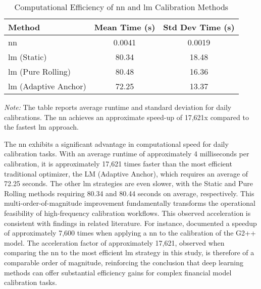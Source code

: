 \begin{table}[H]
	\centering
	\begin{threeparttable}
		\caption{Computational Efficiency of \ac{nn} and \ac{lm} Calibration Methods}
		\label{tab:comp_efficiency}
		\begin{tabular}{lcc}
			\toprule
			Method                       & Mean Time (s) & Std Dev Time (s) \\
			\midrule
			\ac{nn}                      & 0.0041        & 0.0019           \\
			\ac{lm} (Static)             & 80.34         & 18.48            \\
			\ac{lm} (Pure Rolling)       & 80.48         & 16.36            \\
			\ac{lm} (Adaptive Anchor) & 72.25         & 13.37            \\
			\bottomrule
		\end{tabular}
		\begin{tablenotes}
			\footnotesize
			\item \textit{Note:} The table reports average runtime and standard deviation for daily calibrations. The \ac{nn} achieves an approximate speed-up of 17,621x compared to the fastest \ac{lm} approach.
		\end{tablenotes}
	\end{threeparttable}
\end{table}

The \ac{nn} exhibits a significant advantage in computational speed for daily calibration tasks. With an average runtime of approximately 4 milliseconds per calibration, it is approximately 17,621 times faster than the most efficient traditional optimizer, the LM (Adaptive Anchor), which requires an average of 72.25 seconds. The other \ac{lm} strategies are even slower, with the Static and Pure Rolling methods requiring 80.34 and 80.44 seconds on average, respectively. This multi-order-of-magnitude improvement fundamentally transforms the operational feasibility of high-frequency calibration workflows. This observed acceleration is consistent with findings in related literature. For instance, \textcite{alaya2021deep} documented a speedup of approximately 7,600 times when applying a \ac{nn} to the calibration of the G2++ model. The acceleration factor of approximately 17,621, observed when comparing the \ac{nn} to the most efficient \ac{lm} strategy in this study, is therefore of a comparable order of magnitude, reinforcing the conclusion that deep learning methods can offer substantial efficiency gains for complex financial model calibration tasks.

